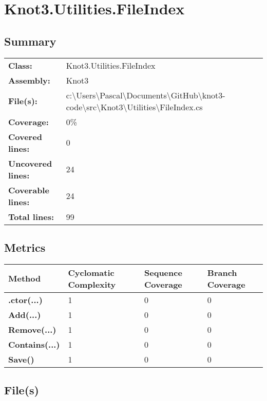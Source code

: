 \documentclass[a4paper,10pt]{article}
\begin{document}
\section{Knot3.Utilities.FileIndex}
\subsection{Summary}
\begin{longtable}[l]{ll}
\textbf{Class:} & Knot3.Utilities.FileIndex\\
\textbf{Assembly:} & Knot3\\
\textbf{File(s):} & \begin{minipage}[t]{12cm}{c:\textbackslash Users\textbackslash Pascal\textbackslash Documents\textbackslash GitHub\textbackslash knot3-code\textbackslash src\textbackslash Knot3\textbackslash Utilities\textbackslash FileIndex.cs}\end{minipage} \\
\textbf{Coverage:} & 0\%\\
\textbf{Covered lines:} & 0\\
\textbf{Uncovered lines:} & 24\\
\textbf{Coverable lines:} & 24\\
\textbf{Total lines:} & 99\\
\end{longtable}
\subsection{Metrics}
\begin{longtable}[l]{|l|l|l|l|}
\hline
\textbf{Method} & \textbf{Cyclomatic Complexity} & \textbf{Sequence Coverage} & \textbf{Branch Coverage}\\
\hline
\textbf{.ctor(...)} & 1 & 0 & 0\\
\hline
\textbf{Add(...)} & 1 & 0 & 0\\
\hline
\textbf{Remove(...)} & 1 & 0 & 0\\
\hline
\textbf{Contains(...)} & 1 & 0 & 0\\
\hline
\textbf{Save()} & 1 & 0 & 0\\
\hline
\end{longtable}
\subsection{File(s)}
\end{document}
